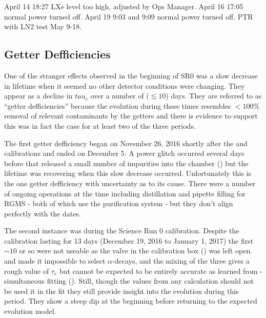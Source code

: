 April 14 18:27 LXe level too high, adjusted by Ops Manager.  April 16 17:05 normal power turned off.  April 19 9:03 and 9:09 normal power
turned off.  PTR with LN2 test May 9-18.



\subsection{Getter Defficiencies}
\label{subsec:electron_lifetime_model_detector_effects_getter}
One of the stranger effects observed in the beginning of SR0 was a slow decrease in lifetime when it seemed no other detector conditions
were changing.  They
appear as a decline in $tau_e$ over a number of ($\lesssim 10$) days.  They are referred to as ``getter defficiencies'' because the
evolution during these times resembles $< 100\%$ removal of relevant
contaminants by the getters and there is evidence to support this was in fact the case for at least two of the three periods.

The first getter defficiency
began on November 26, 2016 shortly after the \ambe and \metakr calibrations and ended on December 5.  A power glitch occurred several
days before that released a small number of impurities into the chamber
() but the lifetime was recovering when this slow decrease
occurred.  Unfortunately this is the one getter defficiency with uncertainty as to its cause.  There were a number of ongoing operations
at the time including  distillation and pipette filling for RGMS - both of which use the purification system - but they don't
align perfectly with the dates.

The second instance was during the Science Run 0 \rncal calibration.  Despite the calibration lasting for 13 days (December 19, 2016 to
January 1, 2017) the first ${\sim} 10$ or
so were not useable as the valve in the calibration box () was left
open.  \rncal and  made it impossible to select  $\alpha$-decays, and the mixing of the three gives a rough
value of $\tau_e$ but cannot be expected to be entirely accurate as learned from \rnbkg- simultaneous fitting
().  Still, though the values from any calculation should not be used it in the
fit they still provide insight into the evolution during this period.  They show a steep dip at the beginning before returning to the
expected evolution model.

